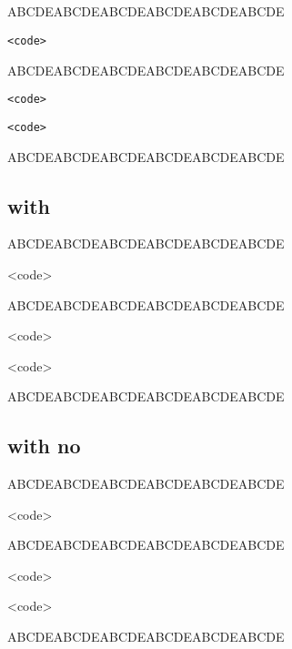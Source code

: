 \noindent
\subsection{}
\bgroup
\makeatletter
\def\CDR@Debug#1{\typeout{**** DEBUG #1}}
\ExplSyntaxOn
\ExplSyntaxOff
{}
\makeatother
ABCDEABCDEABCDEABCDEABCDEABCDE
\begin{Verbatim}
<code>
\end{Verbatim}
ABCDEABCDEABCDEABCDEABCDEABCDE
\begin{Verbatim}
<code>
\end{Verbatim}
\begin{Verbatim}
<code>
\end{Verbatim}
ABCDEABCDEABCDEABCDEABCDEABCDE
\egroup
%
%
\subsection{ with }
\bgroup
\makeatletter
\def\CDR@Debug#1{\typeout{**** DEBUG #1}}
\ExplSyntaxOn
\ExplSyntaxOff
{}
\makeatother
ABCDEABCDEABCDEABCDEABCDEABCDE
\begin{CDRBlock}
<code>
\end{CDRBlock}
ABCDEABCDEABCDEABCDEABCDEABCDE
\begin{CDRBlock}
<code>
\end{CDRBlock}
\begin{CDRBlock}
<code>
\end{CDRBlock}
ABCDEABCDEABCDEABCDEABCDEABCDE
\egroup
%
%
\subsection{ with no }
\bgroup
\makeatletter
\def\CDR@Debug#1{\typeout{**** DEBUG #1}}
\ExplSyntaxOn
\ExplSyntaxOff
{}
\makeatother
ABCDEABCDEABCDEABCDEABCDEABCDE
\begin{CDRBlock}
<code>
\end{CDRBlock}
ABCDEABCDEABCDEABCDEABCDEABCDE
\begin{CDRBlock}
<code>
\end{CDRBlock}
\begin{CDRBlock}
<code>
\end{CDRBlock}
ABCDEABCDEABCDEABCDEABCDEABCDE
\egroup
%
%
